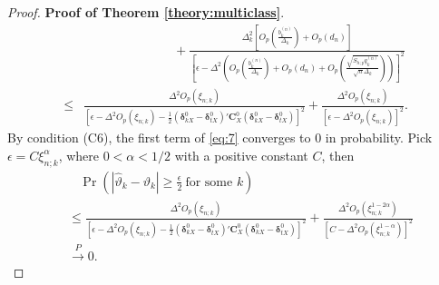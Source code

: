 \documentclass[12pt]{article}
\begin{document}
\begin{proof}{\textbf{Proof of Theorem \ref{theory:multiclass}}.}{}
\begin{align}
& ~~~~~~~~~~~~~~~~~~~~~~~~~~~~~~~~ + \frac{\Delta_k^2 [ O_p(\frac{b_k^{(n)}}{\Delta_k}) + O_p(d_n) ]}{\left[\epsilon - \Delta^2 ( O_p(\frac{b_k^{(n)}}{\Delta_k}) + O_p(d_n) + O_p(\frac{\sqrt{S_{h;p} q_k^{(n)}}}{\sqrt{n} \Delta_k}) ) \right]^2} \nonumber \\
\leq & \frac{\Delta^2 O_p(\xi_{n;k})}{[\epsilon - \Delta^2 O_p(\xi_{n;k}) - \frac{1}{2} (\bm \delta_{kX}^0 - \bm \delta_{tX}^0)' \bm C_X^0 (\bm \delta_{kX}^0 - \bm \delta_{tX}^0)]^2} + \frac{\Delta^2 O_p(\xi_{n;k})}{[\epsilon - \Delta^2 O_p(\xi_{n;k})]^2}.
\end{align}
By condition (C6), the first term of \eqref{eq:7} converges to 0 in probability.
Pick $\epsilon = C \xi_{n;k}^\alpha$, where $0< \alpha < 1/2$ with a positive constant $C$, then
\begin{align*}
& ~~~~ \Pr(|\hat{\vartheta}_k - \vartheta_k| \geq \frac{\epsilon}{2}~ \mbox{for some } k) \\
& \leq  \frac{\Delta^2 O_p(\xi_{n;k})}{[\epsilon - \Delta^2 O_p(\xi_{n;k}) - \frac{1}{2} (\bm \delta_{kX}^0 - \bm \delta_{tX}^0)' \bm C_X^0 (\bm \delta_{kX}^0 - \bm \delta_{tX}^0)]^2} + \frac{\Delta^2 O_p(\xi_{n;k}^{1 - 2 \alpha})}{[C - \Delta^2 O_p(\xi_{n;k}^{1 - \alpha})]^2} \\
& \stackrel{P}{\rightarrow} 0.
\end{align*}
\end{proof}
\end{document}
